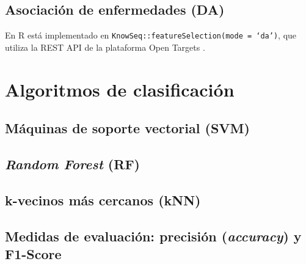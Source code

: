 \subsection{Asociación de enfermedades (DA)}

En R está implementado en \texttt{KnowSeq::featureSelection(mode = `da')}, que utiliza la REST API de la plataforma Open Targets \cite{OpenTargets2020}.

\section{Algoritmos de clasificación}

\subsection{Máquinas de soporte vectorial (SVM)}

\subsection{\textit{Random Forest} (RF)}

\subsection{k-vecinos más cercanos (kNN)}

\subsection{Medidas de evaluación: precisión (\textit{accuracy}) y F1-Score}


